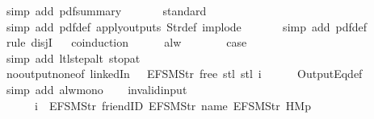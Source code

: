 \begin{isabellebody}
\ {\isacharparenleft}simp\ add{\isacharcolon}\ pdf{\isacharunderscore}summary{\isacharparenright}\isanewline
\ \ \ \ \ \isamarkupfalse%
\ standard\isanewline
\ \ \ \ \ \ \isamarkupfalse%
\ {\isacharparenleft}simp\ add{\isacharcolon}\ pdf{}{\isacharunderscore}def\ apply{\isacharunderscore}outputs\ Str{\isacharunderscore}def\ implode{\isacharparenright}\isanewline
\ \ \ \ \ \isamarkupfalse%
\ {\isacharparenleft}simp\ add{\isacharcolon}\ pdf{}{\isacharunderscore}def{\isacharparenright}\isanewline
\ \ \ \ \isamarkupfalse%
\ {\isacharparenleft}rule\ disjI{}{\isacharparenright}\isanewline
\ \ \isamarkupfalse%
{\isacharparenleft}coinduction{\isacharparenright}\isanewline
\ \ \ \ \isamarkupfalse%
\ alw\isanewline
\ \ \ \ \isamarkupfalse%
\ \isamarkupfalse%
\ {\isacharquery}case\isanewline
\ \ \ \ \ \ \isamarkupfalse%
\ {\isacharparenleft}simp\ add{\isacharcolon}\ ltl{\isacharunderscore}step{\isacharunderscore}alt\ stop{\isacharunderscore}at{\isacharunderscore}{}{\isacharparenright}\isanewline
\ \ \ \ \isamarkupfalse%
\ no{\isacharunderscore}output{\isacharunderscore}none{\isacharbrackleft}of\ linkedIn\ {\isachardoublequoteopen}{\isacharless}{}\ {\isacharcolon}{\isacharequal}\ EFSM{\isachardot}Str\ {\isacharprime}{\isacharprime}free{\isacharprime}{\isacharprime}{\isachargreater}{\isachardoublequoteclose}\ {\isachardoublequoteopen}stl\ {\isacharparenleft}stl\ i{\isacharparenright}{\isachardoublequoteclose}{\isacharbrackright}\isanewline
\ \ \ \ \isamarkupfalse%
\ OutputEq{\isacharunderscore}def\isanewline
\ \ \ \ \isamarkupfalse%
\ {\isacharparenleft}simp\ add{\isacharcolon}\ alw{\isacharunderscore}mono{\isacharparenright}\isanewline
\ \ \isamarkupfalse%
\isanewline
{}\isamarkupfalse%
%
\endisatagproof
{\isafoldproof}%
%
\isadelimproof
\isanewline
%
\endisadelimproof
\isanewline
{}\isamarkupfalse%
\ invalid{\isacharunderscore}input{\isacharunderscore}{}{\isacharcolon}\ \isanewline
\ \ \ \ \ \ {\isachardoublequoteopen}i\ {\isasymnoteq}\ {\isacharbrackleft}EFSM{\isachardot}Str\ {\isacharprime}{\isacharprime}friendID{\isacharprime}{\isacharprime}{\isacharcomma}\ EFSM{\isachardot}Str\ {\isacharprime}{\isacharprime}name{\isacharprime}{\isacharprime}{\isacharcomma}\ EFSM{\isachardot}Str\ {\isacharprime}{\isacharprime}HM{}p{\isacharprime}{\isacharprime}{\isacharbrackright}\ {\isasymLongrightarrow}\isanewline

\end{isabellebody}
